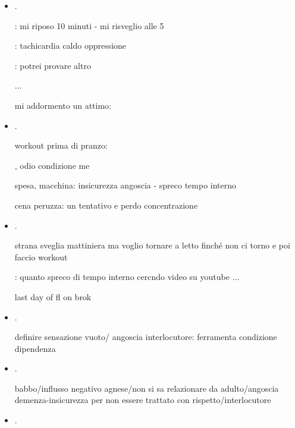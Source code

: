 \begin{itemize}

\item {}.

: mi riposo 10 minuti - mi risveglio alle 5

: tachicardia caldo oppressione

: potrei provare altro

...

mi addormento un attimo: 

\item {}.

workout prima di pranzo: 

, odio condizione me 

spesa, macchina: insicurezza angoscia - spreco tempo interno

cena peruzza: un tentativo e perdo concentrazione


\item {}.

strana sveglia mattiniera ma voglio tornare a letto finch\'e non ci torno e poi faccio workout

: quanto spreco di tempo interno cercndo video su youtube ...

last day of fl on brok

\item {}.

definire sensazione vuoto/ angoscia interlocutore: ferramenta condizione dipendenza


\item {}.

babbo/influsso negativo agnese/non si sa relazionare da adulto/angoscia demenza-insicurezza per non essere trattato con rispetto/interlocutore

\item {}.




\end{itemize}
